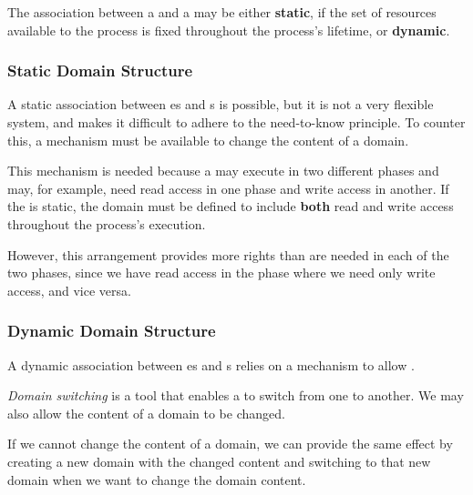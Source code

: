 The association between a  and a  may be either \textbf{static}, if the set of resources available to the process is fixed throughout the process’s lifetime, or \textbf{dynamic}.

\subsubsection{Static Domain Structure}\label{subsubsec:Static_Domain_Structure}
A static association between es and s is possible, but it is not a very flexible system, and makes it difficult to adhere to the need-to-know principle.
To counter this, a mechanism must be available to change the content of a domain.

This mechanism is needed because a  may execute in two different phases and may, for example, need read access in one phase and write access in another.
If the  is static, the domain must be defined to include \textbf{both} read and write access throughout the process's execution.

However, this arrangement provides more rights than are needed in each of the two phases, since we have read access in the phase where we need only write access, and vice versa.

\subsubsection{Dynamic Domain Structure}\label{subsubsec:Dynamic_Domain_Structure}
A dynamic association between es and s relies on a mechanism to allow .

\begin{definition}\label{def:Domain_Switching}
  \emph{Domain switching} is a tool that enables a  to switch from one  to another.
  We may also allow the content of a domain to be changed.
\end{definition}

If we cannot change the content of a domain, we can provide the same effect by creating a new domain with the changed content and switching to that new domain when we want to change the domain content.

